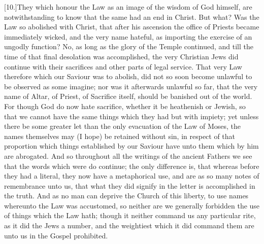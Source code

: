 [10.]They which honour the Law as an image of the wisdom of God himself, are notwithstanding to know that the same had an end in Christ. But what? Was the Law so abolished with Christ, that after his ascension the office of Priests became immediately wicked, and the very name hateful, as importing the exercise of an ungodly function? No, as long as the glory of the Temple continued, and till the time of that final desolation was accomplished, the very Christian Jews did continue with their sacrifices and other parts of legal service. That very Law therefore which our Saviour was to abolish, did not so soon become unlawful to be  observed as some imagine; nor was it afterwards unlawful so far, that the very name of Altar, of Priest, of Sacrifice itself, should be banished out of the world. For though God do now hate sacrifice, whether it be heathenish or Jewish, so that we cannot have the same things which they had but with impiety; yet unless there be some greater let than the only evacuation of the Law of Moses, the names themselves may (I hope) be retained without sin, in respect of that proportion which things established by our Saviour have unto them which by him are abrogated. And so throughout all the writings of the ancient Fathers we see that the words which were do continue; the only difference is, that whereas before they had a literal, they now have a metaphorical use, and are as so many notes of remembrance unto us, that what they did signify in the letter is accomplished in the truth. And as no man can deprive the Church of this liberty, to use names whereunto the Law was accustomed, so neither are we generally forbidden the use of things which the Law hath; though it neither command us any particular rite, as it did the Jews a number, and the weightiest which it did command them are unto us in the Gospel prohibited.

